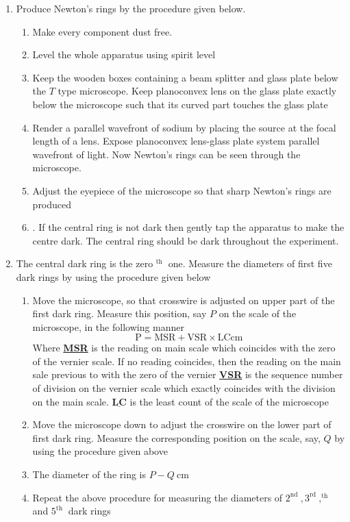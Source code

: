 \documentclass[11pt]{article}
\begin{document}
	\begin{enumerate}
		\item Produce Newton's rings by the procedure given below.
		\begin{enumerate}
			\item Make every component dust free.
			\item	Level the whole apparatus using spirit level
			\item Keep the wooden boxes containing a beam splitter and glass plate below the $T$ type microscope. Keep planoconvex lens on the glass plate exactly below the microscope such that its curved part touches the glass plate
			\item Render a parallel wavefront of sodium by placing the source at the focal length of a lens. Expose planoconvex lens-glass plate system parallel wavefront of light. Now Newton's rings can be seen through the microscope.
			\item Adjust the eyepiece of the microscope so that sharp Newton's rings are produced
			\item . If the central ring is not dark then gently tap the apparatus to make the centre dark. The central ring should be dark throughout the experiment.
		\end{enumerate}
	
		\item The central dark ring is the zero ${ }^{\text {th }}$ one. Measure the diameters of first five dark rings by using the procedure given below
		\begin{enumerate}
			\item Move the microscope, so that crosswire is adjusted on upper part of the first dark ring. Measure this position, say $P$ on the scale of the microscope, in the following manner
				$$
				\mathrm{P}=\mathrm{MSR}+\mathrm{VSR} \times \mathrm{LC} \mathrm{cm}
				$$
				Where \textbf{\underline{MSR}} is the reading on main scale which coincides with the zero of the vernier scale. If no reading coincides, then the reading on the main sale previous to with the zero of the vernier
				\textbf{\underline{VSR}} is the sequence number of division on the vernier scale which exactly coincides with the division on the main scale.
				$\underline{\mathbf{L C}}$ is the least  
				count of the scale of the microscope
			\item Move the microscope down to adjust the crosswire on the lower part of first dark ring. Measure the corresponding position on the scale, say, $Q$ by using the procedure given above
			\item The diameter of the ring is $P-Q \mathrm{~cm}$
			\item Repeat the above procedure for measuring the diameters of $2^{\text {nd }}, 3^{\text {rd }}, ^{\text {th }}$ and $5^{\text {th }}$ dark rings
	

\end{enumerate}
\end{enumerate}
\end{document}
